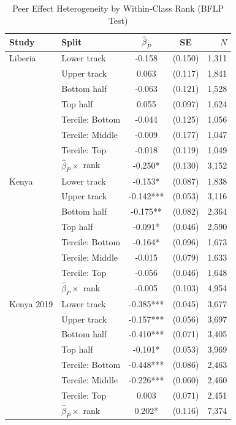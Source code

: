 \begin{table}[htbp]
\centering\small
\caption{Peer Effect Heterogeneity by Within-Class Rank (BFLP Test)}
\label{tab:peer_bflp}
\begin{tabular}{llccr}
\toprule
Study & Split & $\hat{\beta}_P$ & SE & $N$ \\
\midrule
Liberia & Lower track & -0.158 & (0.150) & 1,311 \\
 & Upper track & 0.063 & (0.117) & 1,841 \\
 & Bottom half & -0.063 & (0.121) & 1,528 \\
 & Top half & 0.055 & (0.097) & 1,624 \\
 & Tercile: Bottom & -0.044 & (0.125) & 1,056 \\
 & Tercile: Middle & -0.009 & (0.177) & 1,047 \\
 & Tercile: Top & -0.018 & (0.119) & 1,049 \\
 & $\hat{\beta}_P \times$ rank & -0.250* & (0.130) & 3,152 \\
\addlinespace
Kenya & Lower track & -0.153* & (0.087) & 1,838 \\
 & Upper track & -0.142*** & (0.053) & 3,116 \\
 & Bottom half & -0.175** & (0.082) & 2,364 \\
 & Top half & -0.091* & (0.046) & 2,590 \\
 & Tercile: Bottom & -0.164* & (0.096) & 1,673 \\
 & Tercile: Middle & -0.015 & (0.079) & 1,633 \\
 & Tercile: Top & -0.056 & (0.046) & 1,648 \\
 & $\hat{\beta}_P \times$ rank & -0.005 & (0.103) & 4,954 \\
\addlinespace
Kenya 2019 & Lower track & -0.385*** & (0.045) & 3,677 \\
 & Upper track & -0.157*** & (0.056) & 3,697 \\
 & Bottom half & -0.410*** & (0.071) & 3,405 \\
 & Top half & -0.101* & (0.053) & 3,969 \\
 & Tercile: Bottom & -0.448*** & (0.086) & 2,463 \\
 & Tercile: Middle & -0.226*** & (0.060) & 2,460 \\
 & Tercile: Top & 0.003 & (0.071) & 2,451 \\
 & $\hat{\beta}_P \times$ rank & 0.202* & (0.116) & 7,374 \\
\bottomrule
\end{tabular}
\par\smallskip{}
\end{table}
